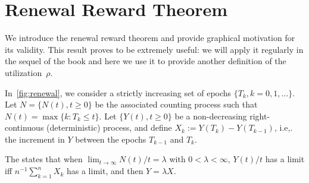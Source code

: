 

\section{Renewal Reward Theorem}
\label{sec:renew-reward-theor}


We introduce  the renewal reward theorem and provide graphical motivation for its validity.
This result proves to be extremely useful: we will apply it regularly in the sequel of the book and here we use it to provide another definition of the utilization~$\rho$.


In~\cref{fig:renewal},  we consider a strictly increasing set of epochs $\{T_k, k=0, 1, \ldots\}$.
Let $N=\{N(t), t\geq 0\}$ be the associated counting process such that  $N(t) = \max\{k : T_k \leq t\}$.
Let $\{Y(t), t\geq 0\}$ be a non-decreasing right-continuous (deterministic) process, and define $X_k := Y(T_k)-Y(T_{k-1})$, i.e,.
the increment
in $Y$ between the epochs $T_{k-1}$ and $T_k$.

The  states that when $\lim_{t\to\infty} N(t)/t = \lambda$ with $0<\lambda < \infty$, $Y(t)/t$ has a limit iff $n^{-1}\sum_{k=1}^n X_k$ has a limit, and then $Y=\lambda X$.



